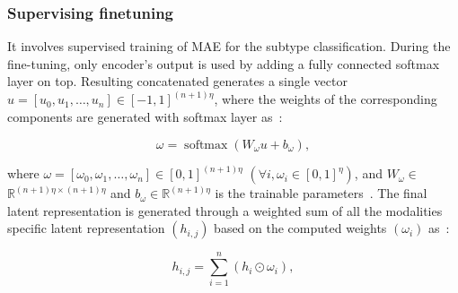 \subsubsection{Supervising finetuning} 

It involves supervised training of MAE for the subtype classification. During the fine-tuning, only encoder's output is used by adding a fully connected softmax layer on top. Resulting concatenated generates a single vector $u=\left[u_{0}, u_{1}, \ldots, u_{n}\right] \in[-1,1]^{(n+1) \eta}$, where the weights of the corresponding components are generated with  softmax layer as~\cite{mmdcae}:

\begin{equation}
    \omega=\operatorname{softmax}\left(W_{\omega} u+b_{\omega}\right),
\end{equation}

\hspace*{3.5mm} where $\omega=\left[\omega_{0}, \omega_{1}, \ldots, \omega_{n}\right] \in[0,1]^{(n+1) \eta}$ $\left(\forall i, \omega_{i} \in[0,1]^{\eta}\right)$, and  $W_{\omega} \in$ $\mathbb{R}^{(n+1) \eta \times(n+1) \eta}$ and $b_{\omega} \in \mathbb{R}^{(n+1) \eta}$ is the trainable parameters~\cite{mmdcae}. The final latent representation is generated through a weighted sum of all the modalities specific latent representation $\left(h_{i,j}\right)$ based on the computed weights $\left(\omega_{i}\right)$ as~\cite{mmdcae}: 

\begin{equation}
   h_{i,j}=\sum_{i=1}^{n}\left(h_{i} \odot \omega_{i}\right),
\end{equation}

